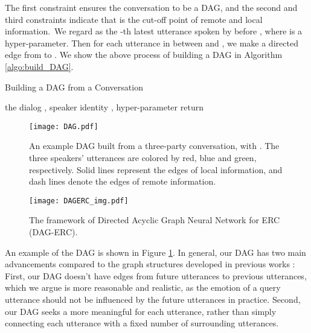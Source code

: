 \documentclass[11pt,a4paper]{article}
\begin{document}
The first constraint ensures the conversation to be a DAG, and the second and third constraints indicate that  is the cut-off point of remote and local information.~We regard  as the -th latest utterance spoken by  before , where  is a hyper-parameter. Then for each utterance  in between  and , we make a directed edge from  to . We show the above process of building a DAG in Algorithm \ref{algo:build_DAG}.

\begin{algorithm}[t]
	\renewcommand{\algorithmicrequire}{\textbf{Input:}}
	\renewcommand{\algorithmicensure}{\textbf{Output:}}
	\caption{Building a DAG from a Conversation}
	\label{algo:build_DAG}
	\begin{algorithmic}[1]
		\REQUIRE the dialog , speaker identity , hyper-parameter 
		\ENSURE 
		\STATE  
		\STATE 
		\STATE  
		\FORALL{}
		\STATE 
		\STATE 
		\IF{}
		\STATE 
		\STATE 
		\ELSE
		\STATE 
		\ENDIF
		\STATE 
		\ENDWHILE
		\ENDFOR
		\STATE return 
	\end{algorithmic}  
\end{algorithm}

\begin{figure}[t]
	\centering
\texttt{[image: DAG.pdf]}
	\caption{An example DAG built from a three-party conversation, with . The three speakers' utterances are colored by red, blue and green, respectively. Solid lines represent the edges of local information, and dash lines denote the edges of remote information.}
	\label{fig:DAG}
\end{figure} 

\begin{figure*}[t]
\vspace{0.5cm}
	\centering
	\texttt{[image: DAGERC\_img.pdf]} \caption{The framework of {D}irected {A}cyclic {G}raph Neural Network for {ERC} (DAG-ERC).}
	\label{fig:DAG-ERC}
	\vspace{0.0cm}
\end{figure*} 



An example of the DAG is shown in Figure \ref{fig:DAG}. In general, our DAG has two main advancements compared to the graph structures developed in previous works \cite{ghosal2019dialoguegcn,ishiwatari2020relation}: First, our DAG doesn't have edges from future utterances to previous utterances, which we argue is more reasonable and realistic, as the emotion of a query utterance should not be influenced by the future utterances in practice. Second, our DAG seeks a more meaningful  for each utterance, rather than simply connecting each utterance with a fixed number of surrounding utterances.
\end{document}
